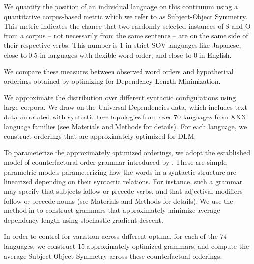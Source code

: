 \documentclass[11pt,a4paper]{article}
\newcommand\comment[1]{{\color{red}#1}}
\newcommand\mhahn[1]{{\color{red}(#1)}}
\begin{document}
We quantify the position of an individual language on this continuum using a quantitative corpus-based metric which we refer to as Subject-Object Symmetry.
This metric indicates the chance that two randomly selected instances of S and O from a corpus -- not necessarily from the same sentence -- are on the same side of their respective verbs. This number is 1 in strict SOV languages like Japanese, close to 0.5 in languages with flexible word order, and close to 0 in English.



We compare these measures between observed word orders and hypothetical orderings obtained by optimizing for Dependency Length Minimization.

We approximate the distribution over different syntactic configurations using large corpora.
We draw on the Universal Dependencies data, which includes text data annotated with syntactic tree topologies from over 70 languages from XXX language families (see Materials and Methods for details).
For each language, we construct orderings that are approximately optimized for DLM.

To parameterize the approximately optimized orderings, we adopt the established model of counterfactural order grammar introduced by \citet{gildea-optimizing-2007}.
These are simple, parametric models parameterizing how the words in a syntactic structure are linearized depending on their syntactic relations.
For instance, such a grammar may specify that subjects follow or precede verbs, and that adjectival modifiers follow or precede nouns (see Materials and Methods for details).
We use the method in \citet{hahn2020universals} to construct grammars that approximately minimize average dependency length using stochastic gradient descent.

In order to control for variation across different optima, for each of the 74 languages, we construct 15 approximately optimized grammars, and compute the average Subject-Object Symmetry across these counterfactual orderings.

\end{document}
